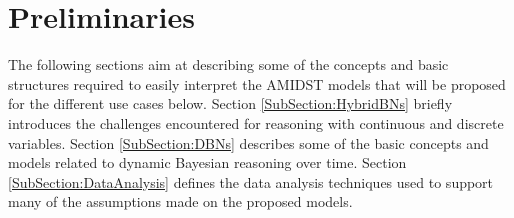 \section{Preliminaries}\label{Section:Preliminaries}

The following sections aim at describing some of the concepts and basic structures required to easily interpret the AMIDST models that will be proposed for the different use cases below. Section \ref{SubSection:HybridBNs} briefly introduces the challenges encountered for reasoning with continuous and discrete variables. Section \ref{SubSection:DBNs} describes some of the basic concepts and models related to dynamic Bayesian reasoning over time. Section \ref{SubSection:DataAnalysis} defines the data analysis techniques used to support many of the assumptions made on the proposed models.



